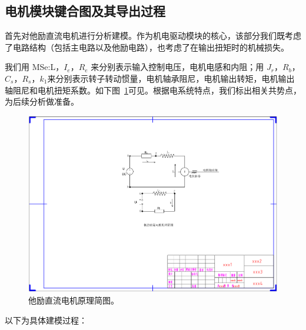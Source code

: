 \clearpage

\subsection{电机模块键合图及其导出过程}

首先对他励直流电机进行分析建模。作为机电驱动模块的核心，该部分我们既考虑了电路结构（包括主电路以及他励电路），也考虑了在输出扭矩时的机械损失。

我们用 MSe:L，$ I_e $，$ R_e $ 来分别表示输入控制电压，电机电感和内阻；用 $ J_r $，$ R_b $，$ C_s $，$ R_s $，$ k_1 $来分别表示转子转动惯量，电机轴承阻尼，电机输出转矩，电机输出轴阻尼和电机扭矩系数。如下图~\ref{fig:separately_excited_dc_motor}可见。根据电系统特点，我们标出相关共势点，为后续分析做准备。

\begin{figure}[!h]
	\centering
	\includegraphics[width=1\textwidth]{fig/separately_excited_dc_motor.pdf}
	\caption{他励直流电机原理简图。}\label{fig:separately_excited_dc_motor} %
\end{figure}

以下为具体建模过程：

